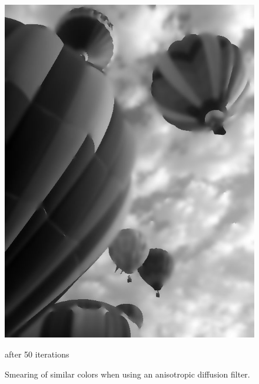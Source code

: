 \begin{figure}
\begin{minipage}[b]{0.45\linewidth}
\includegraphics[width=\textwidth]{baloons_resized_bw_50.jpg}
\caption*{after 50 iterations}
\end{minipage}
\caption{Smearing of similar colors when using an anisotropic diffusion filter.}
\label{fig:anisdif_smearing}
\end{figure}

